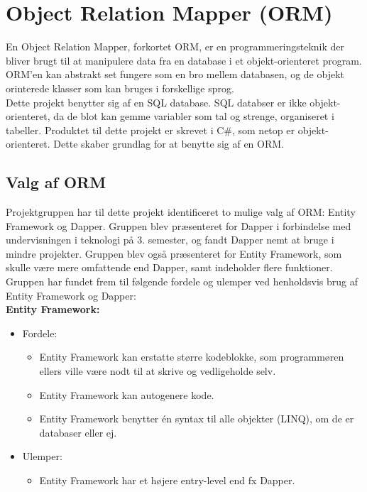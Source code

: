 \section{Object Relation Mapper (ORM)}\label{sec:orm}
En Object Relation Mapper, forkortet ORM, er en programmeringsteknik der bliver brugt til
at manipulere data fra en database i et objekt-orienteret program. ORM'en kan abstrakt set fungere som en bro mellem databasen, og de objekt orinterede klasser som kan bruges i forskellige sprog.   
\\

Dette projekt benytter sig af en SQL database. SQL databser er ikke objekt-orienteret, da de
blot kan gemme variabler som tal og strenge, organiseret i tabeller. Produktet til dette projekt
er skrevet i C\#, som netop er objekt-orienteret. Dette skaber grundlag for at benytte sig af en
ORM. 

\subsection{Valg af ORM}
Projektgruppen har til dette projekt identificeret to mulige valg af ORM: Entity Framework og Dapper.
Gruppen blev præsenteret for Dapper i forbindelse med undervisningen i teknologi på 3. semester, og fandt Dapper
nemt at bruge i mindre projekter. Gruppen blev også præsenteret for Entity Framework, som skulle være mere omfattende
end Dapper, samt indeholder flere funktioner. \\ 
Gruppen har fundet frem til følgende fordele og ulemper ved henholdsvis brug af Entity Framework og Dapper: \\

\textbf{Entity Framework:}
\begin{itemize}
    \item Fordele:
    \begin{itemize}
        \item Entity Framework kan erstatte større kodeblokke, som programmøren ellers ville være nodt til at skrive og vedligeholde selv.
        \item Entity Framework kan autogenere kode.
        \item Entity Framework benytter én syntax til alle objekter (LINQ), om de er databaser eller ej.
    \end{itemize}
    \item Ulemper:
    \begin{itemize}
        \item Entity Framework har et højere entry-level end fx Dapper.
    \end{itemize}
\end{itemize}

